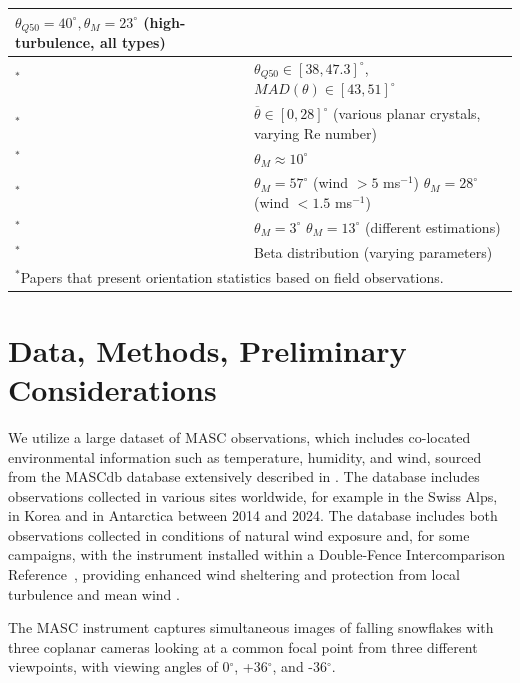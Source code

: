 \documentclass[draft]{agujournal2019}
\begin{document}
\begin{table}
\begin{tabular}{l p{90mm}}
   $\theta_{Q50}= 40^\circ, \theta_{M} = 23^\circ$ (high-turbulence, all types) \\
   \hline
   \cite{Gergely_JGRA_2016}$^*$ &  $\theta_{Q50} \in [38,47.3]^\circ$, $MAD(\theta) \in [43,51]^\circ$ \\
   \hline
   \cite{Stout_ACP_2024}$^*$ &  $\overline{\theta} \in [0,28]^\circ$ (various planar crystals, varying Re number)\\
   \hline
   \cite{Jiang_JAS_2019}$^*$ & $\theta_{M}\approx 10^\circ$ \\
   \hline
   \cite{Fitch_AMT_2021}$^*$ & $\theta_{M} = 57^\circ$ (wind $> 5$ ms$^{-1}$) \newline
   $\theta_{M} = 28^\circ$ (wind $< 1.5$ ms$^{-1}$) \\
   \hline
   \cite{Fitch_JGR_2022}$^*$ & $\theta_{M} = 3^\circ$ 
   \newline
   $\theta_{M} = 13^\circ$ (different estimations)  \\
   \hline
   \cite{Schrom_JAS_2023}$^*$ & Beta distribution (varying parameters) \\
   \hline
    \multicolumn{2}{l}{$^{*}$Papers that present orientation statistics based on field observations.}
 \end{tabular}
 \end{table}

 
\section{Data, Methods, Preliminary Considerations}

We utilize a large dataset of MASC observations, which includes co-located environmental information such as temperature, humidity, and wind, sourced from the MASCdb database extensively described in \cite{Grazioli_SD_2022}. The database includes observations collected in various sites worldwide, for example in the Swiss Alps, in Korea and in Antarctica between 2014 and 2024. The database includes both observations collected in conditions of natural wind exposure and, for some campaigns, with the instrument installed within a Double-Fence Intercomparison Reference~\cite<DFIR, see for example>{Smith_HESS_2020}, providing enhanced wind sheltering and protection from local turbulence and mean wind . 

The MASC instrument captures simultaneous images of falling snowflakes with three coplanar cameras looking at a common focal point from three different viewpoints, with viewing angles of 0$^\circ$, +36$^\circ$, and -36$^\circ$.
\end{document}
